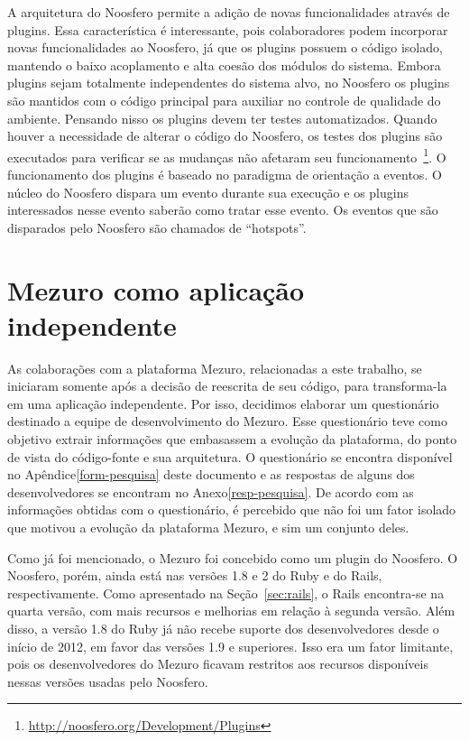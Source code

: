 A arquitetura do Noosfero permite a adição de novas funcionalidades através de plugins. Essa característica é interessante, pois colaboradores podem incorporar novas funcionalidades ao Noosfero, já que os plugins possuem o código isolado, mantendo o baixo acoplamento e alta coesão dos módulos do sistema.
%
Embora plugins sejam totalmente independentes do sistema alvo, no Noosfero os plugins são mantidos com o código principal para auxiliar no controle de qualidade do ambiente. Pensando nisso os plugins devem ter testes automatizados. Quando houver a necessidade de alterar o código do Noosfero, os testes dos plugins são executados para verificar se as mudanças não afetaram seu funcionamento~\footnote{\url{http://noosfero.org/Development/Plugins}}.
%
O funcionamento dos plugins é baseado no paradigma de orientação a eventos. O núcleo do Noosfero dispara um evento durante sua execução e os plugins interessados nesse evento saberão como tratar esse evento. Os eventos que são disparados pelo Noosfero são chamados de “hotspots”.

\section{Mezuro como aplicação independente}

As colaborações com a plataforma Mezuro, relacionadas a este trabalho, se iniciaram somente após a decisão de reescrita de seu código, para transforma-la em uma aplicação independente. Por isso, decidimos elaborar um questionário destinado a equipe de desenvolvimento do Mezuro. Esse questionário teve como objetivo extrair informações que embasassem a evolução da plataforma, do ponto de vista do código-fonte e sua arquitetura. O questionário se encontra disponível no Apêndice\ref{form-pesquisa} deste documento e as respostas de alguns dos desenvolvedores se encontram no Anexo\ref{resp-pesquisa}.
%
De acordo com as informações obtidas com o questionário, é percebido que não foi um fator isolado que motivou a evolução da plataforma Mezuro, e sim um conjunto deles. 

Como já foi mencionado, o Mezuro foi concebido como um plugin do Noosfero. O Noosfero, porém, ainda está nas versões 1.8 e 2 do Ruby e do Rails, respectivamente. Como apresentado na Seção~\ref{sec:rails}, o Rails encontra-se na quarta versão, com mais recursos e melhorias em relação à segunda versão. Além disso, a versão 1.8 do Ruby já não recebe suporte dos desenvolvedores desde o início de 2012, em favor das versões 1.9 e superiores. Isso era um fator limitante, pois os desenvolvedores do Mezuro ficavam restritos aos recursos disponíveis nessas versões usadas pelo Noosfero.

